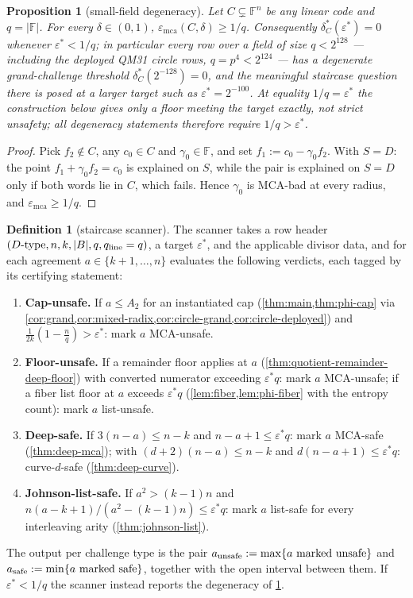 \documentclass[11pt]{article}
\newtheorem{proposition}[theorem]{Proposition}
\theoremstyle{definition}
\newtheorem{definition}[theorem]{Definition}
\theoremstyle{remark}
\newcommand{\F}{\mathbb{F}}
\newcommand{\B}{B}
\newcommand{\emca}{\varepsilon_{\mathrm{mca}}}
\begin{document}
\begin{proposition}[small-field degeneracy]\label{prop:small-field}
Let $C\subsetneq\F^n$ be any linear code and $q=|\F|$. For every $\delta\in(0,1)$, $\emca(C,\delta)\ge1/q$. Consequently $\delta^*_C(\varepsilon^*)=0$ whenever $\varepsilon^*<1/q$; in particular every row over a field of size $q<2^{128}$ --- including the deployed QM31 circle rows, $q=p^4<2^{124}$ --- has a degenerate grand-challenge threshold $\delta^*_C(2^{-128})=0$, and the meaningful staircase question there is posed at a larger target such as $\varepsilon^*=2^{-100}$. At equality $1/q=\varepsilon^*$ the construction below gives only a floor meeting the target exactly, not strict unsafety; all degeneracy statements therefore require $1/q>\varepsilon^*$.
\end{proposition}

\begin{proof}
Pick $f_2\notin C$, any $c_0\in C$ and $\gamma_0\in\F$, and set $f_1:=c_0-\gamma_0f_2$. With $S=D$: the point $f_1+\gamma_0f_2=c_0$ is explained on $S$, while the pair is explained on $S=D$ only if both words lie in $C$, which fails. Hence $\gamma_0$ is MCA-bad at every radius, and $\emca\ge1/q$.
\end{proof}

\begin{definition}[staircase scanner]\label{def:scanner}
The scanner takes a row header $(D\text{-type},n,k,|\B|,q,q_{\rm line}=q)$, a target $\varepsilon^*$, and the applicable divisor data, and for each agreement $a\in\{k+1,\dots,n\}$ evaluates the following verdicts, each tagged by its certifying statement:
\begin{enumerate}[label=\textup{(V\arabic*)},leftmargin=2.6em]
\item \textbf{Cap-unsafe.} If $a\le A_2$ for an instantiated cap \textup(\cref{thm:main,thm:phi-cap} via \cref{cor:grand,cor:mixed-radix,cor:circle-grand,cor:circle-deployed}\textup) and $\frac1{2k}(1-\frac nq)>\varepsilon^*$: mark $a$ MCA-unsafe.
\item \textbf{Floor-unsafe.} If a remainder floor applies at $a$ \textup(\cref{thm:quotient-remainder-deep-floor}\textup) with converted numerator exceeding $\varepsilon^*q$: mark $a$ MCA-unsafe; if a fiber list floor at $a$ exceeds $\varepsilon^*q$ \textup(\cref{lem:fiber,lem:phi-fiber} with the entropy count\textup): mark $a$ list-unsafe.
\item \textbf{Deep-safe.} If $3(n-a)\le n-k$ and $n-a+1\le\varepsilon^*q$: mark $a$ MCA-safe \textup(\cref{thm:deep-mca}\textup); with $(d+2)(n-a)\le n-k$ and $d(n-a+1)\le\varepsilon^*q$: curve-$d$-safe \textup(\cref{thm:deep-curve}\textup).
\item \textbf{Johnson-list-safe.} If $a^2>(k-1)n$ and $n(a-k+1)/(a^2-(k-1)n)\le\varepsilon^*q$: mark $a$ list-safe for every interleaving arity \textup(\cref{thm:johnson-list}\textup).
\end{enumerate}
The output per challenge type is the pair $a_{\rm unsafe}:=\max\{a\ \text{marked unsafe}\}$ and $a_{\rm safe}:=\min\{a\ \text{marked safe}\}$, together with the open interval between them. If $\varepsilon^*<1/q$ the scanner instead reports the degeneracy of \cref{prop:small-field}.
\end{definition}
\end{document}
